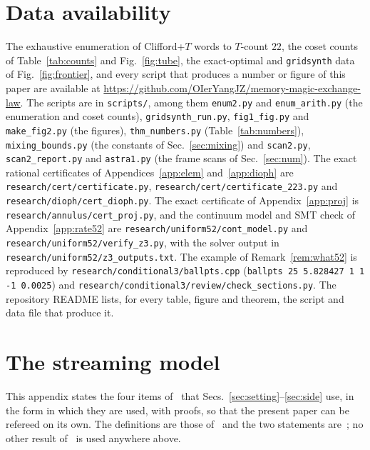 \documentclass[aps,prx,twocolumn,superscriptaddress,nofootinbib,longbibliography]{revtex4-2}
\theoremstyle{plain}
\theoremstyle{definition}
\theoremstyle{remark}
\begin{document}
\section*{Data availability}
{\raggedright
The exhaustive enumeration of Clifford+$T$ words to $T$-count $22$, the coset counts of Table~\ref{tab:counts} and Fig.~\ref{fig:tube}, the exact-optimal and \texttt{gridsynth} data of Fig.~\ref{fig:frontier}, and every script that produces a number or figure of this paper are available at \url{https://github.com/OIerYangJZ/memory-magic-exchange-law}. The scripts are in \texttt{scripts/}, among them \texttt{enum2.py} and \texttt{enum\_arith.py} (the enumeration and coset counts), \texttt{gridsynth\_run.py}, \texttt{fig1\_fig.py} and \texttt{make\_fig2.py} (the figures), \texttt{thm\_numbers.py} (Table~\ref{tab:numbers}), \texttt{mixing\_bounds.py} (the constants of Sec.~\ref{sec:mixing}) and \texttt{scan2.py}, \texttt{scan2\_report.py} and \texttt{astra1.py} (the frame scans of Sec.~\ref{sec:num}). The exact rational certificates of Appendices~\ref{app:elem} and~\ref{app:dioph} are \texttt{research/cert/certificate.py}, \texttt{research/cert/certificate\_223.py} and \texttt{research/dioph/cert\_dioph.py}. The exact certificate of Appendix~\ref{app:proj} is \texttt{research/annulus/cert\_proj.py}, and the continuum model and SMT check of Appendix~\ref{app:rate52} are \texttt{research/uniform52/cont\_model.py} and \texttt{research/uniform52/verify\_z3.py}, with the solver output in \texttt{research/uniform52/z3\_outputs.txt}. The example of Remark~\ref{rem:what52} is reproduced by \texttt{research/conditional3/ballpts.cpp} (\texttt{ballpts 25 5.828427 1 1 -1 0.0025}) and \texttt{research/conditional3/review/check\_sections.py}. The repository README lists, for every table, figure and theorem, the script and data file that produce it.\par}

\appendix

\section{The streaming model}\label{app:model}

This appendix states the four items of~\cite{Paper1} that Secs.~\ref{sec:setting}--\ref{sec:side} use, in the form in which they are used, with proofs, so that the present paper can be refereed on its own. The definitions are those of~\cite[Def.~9, 13, 20, 21]{Paper1} and the two statements are~\cite[Lem.~1, Prop.~10]{Paper1}; no other result of~\cite{Paper1} is used anywhere above.
\end{document}
